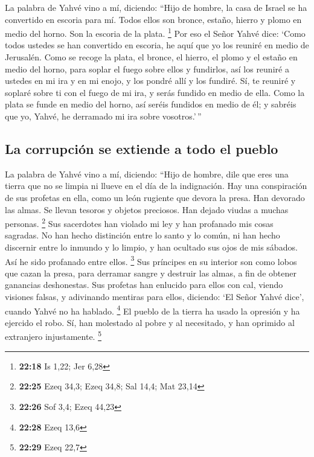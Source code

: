  La palabra de Yahvé vino a mí, diciendo: 
``Hijo de hombre, la casa de Israel se ha convertido en escoria para mí.
Todos ellos son bronce, estaño, hierro y plomo en medio del horno. Son
la escoria de la plata. \footnote{\textbf{22:18} Is 1,22; Jer 6,28}
 Por eso el Señor Yahvé dice: `Como todos ustedes se han
convertido en escoria, he aquí que yo los reuniré en medio de Jerusalén.
 Como se recoge la plata, el bronce, el hierro, el plomo
y el estaño en medio del horno, para soplar el fuego sobre ellos y
fundirlos, así los reuniré a ustedes en mi ira y en mi enojo, y los
pondré allí y los fundiré.  Sí, te reuniré y soplaré
sobre ti con el fuego de mi ira, y serás fundido en medio de ella.
 Como la plata se funde en medio del horno, así seréis
fundidos en medio de él; y sabréis que yo, Yahvé, he derramado mi ira
sobre vosotros.'\,''

\hypertarget{la-corrupciuxf3n-se-extiende-a-todo-el-pueblo}{%
\subsection{La corrupción se extiende a todo el
pueblo}\label{la-corrupciuxf3n-se-extiende-a-todo-el-pueblo}}

 La palabra de Yahvé vino a mí, diciendo: 
``Hijo de hombre, dile que eres una tierra que no se limpia ni llueve en
el día de la indignación.  Hay una conspiración de sus
profetas en ella, como un león rugiente que devora la presa. Han
devorado las almas. Se llevan tesoros y objetos preciosos. Han dejado
viudas a muchas personas. \footnote{\textbf{22:25} Ezeq 34,3; Ezeq 34,8;
  Sal 14,4; Mat 23,14}  Sus sacerdotes han violado mi ley
y han profanado mis cosas sagradas. No han hecho distinción entre lo
santo y lo común, ni han hecho discernir entre lo inmundo y lo limpio, y
han ocultado sus ojos de mis sábados. Así he sido profanado entre ellos.
\footnote{\textbf{22:26} Sof 3,4; Ezeq 44,23}  Sus
príncipes en su interior son como lobos que cazan la presa, para
derramar sangre y destruir las almas, a fin de obtener ganancias
deshonestas.  Sus profetas han enlucido para ellos con
cal, viendo visiones falsas, y adivinando mentiras para ellos, diciendo:
`El Señor Yahvé dice', cuando Yahvé no ha hablado. \footnote{\textbf{22:28}
  Ezeq 13,6}  El pueblo de la tierra ha usado la opresión
y ha ejercido el robo. Sí, han molestado al pobre y al necesitado, y han
oprimido al extranjero injustamente. \footnote{\textbf{22:29} Ezeq 22,7}

